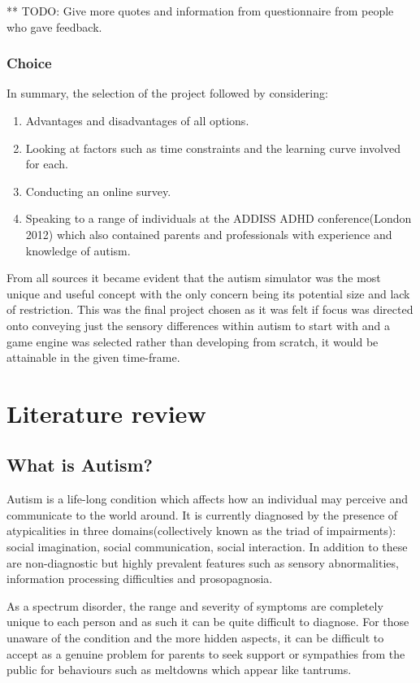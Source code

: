 \documentclass[11pt]{report}
\begin{document}
** TODO: Give more quotes and information from questionnaire from people who gave feedback.

\subsection{Choice}

In summary, the selection of the project followed by considering:

\begin{enumerate}
\item Advantages and disadvantages of all options.
\item Looking at factors such as time constraints and the learning curve involved for each.
\item Conducting an online survey.
\item Speaking to a range of individuals at the ADDISS ADHD conference(London 2012) which also contained parents and professionals with experience and knowledge of autism.
\end{enumerate}

From all sources it became evident that the autism simulator was the most unique and useful concept with the only concern being its potential size and lack of restriction. This was the final project chosen as it was felt
if focus was directed onto conveying just the sensory differences within autism to start with and a game engine was selected rather than developing from scratch, it would be attainable in the given time-frame.

\chapter{Literature review}

\section{What is Autism?}

Autism is a life-long condition which affects how an individual may perceive and communicate to the world around\cite{nas}. It is currently diagnosed by the presence of atypicalities in three domains(collectively known as the triad of impairments): social imagination, social communication, social interaction. In addition to these are non-diagnostic but highly prevalent features such as sensory abnormalities, information processing difficulties and prosopagnosia\cite{blah}. 

As a spectrum disorder, the range and severity of symptoms are completely unique to each person and as such it can be quite difficult to diagnose. For those unaware of the condition and the more hidden aspects, it can be difficult to accept as a genuine problem for parents to seek support or sympathies from the public for behaviours such as meltdowns which appear like tantrums.
\end{document}
